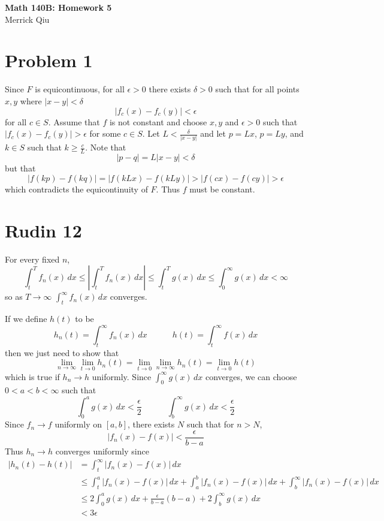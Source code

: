 \documentclass{article}
\begin{document}
\begin{center}
	\huge{\bf Math 140B: Homework 5} \\
	Merrick Qiu
\end{center}

\section*{Problem 1}

Since $F$ is equicontinuous,
for all $\epsilon > 0$ there exists $\delta > 0$ such that
for all points $x, y$ where $|x-y| < \delta$ 
\[
	|f_c(x) - f_c(y)| < \epsilon
\]
for all $c \in S$.
Assume that $f$ is not constant
and choose $x,y$ and $\epsilon > 0$ such that 
$|f_c(x) - f_c(y)| > \epsilon$ for some $c \in S$.
Let $L < \frac{\delta}{|x-y|}$ and let $p = Lx$, $p = Ly$, and 
$k \in S$ such that $k \geq \frac{c}{L}$.
Note that 
\[
	|p-q| = L|x-y| < \delta
\]
but that 
\[
	|f(kp) - f(kq)| = |f(kLx) - f(kLy)| > |f(cx) - f(cy)| > \epsilon
\]
which contradicts the equicontinuity of $F$.
Thus $f$ must be constant.
\newpage 

\section*{Rudin 12}
For every fixed $n$, 
\[
	\int_t^T f_n(x) \,dx \leq \left|\int_t^T f_n(x) \,dx \right| \leq \int_t^T g(x) \,dx \leq \int_0^\infty g(x) \,dx < \infty
\]
so as $T \to \infty$ $\int_t^\infty f_n(x) \,dx$ converges.

If we define $h(t)$ to be
\[
	h_n(t) = \int_t^\infty f_n(x) \,dx \quad\quad\quad h(t) = \int_t^\infty f(x) \,dx
\]
then we just need to show that 
\[
	\lim_{n \to \infty} \lim_{t \to 0} h_n(t) = \lim_{t \to 0} \lim_{n \to \infty}  h_n(t) = \lim_{t \to 0} h(t)
\]
which is true if $h_n \to h$ uniformly.
Since $\int_0^\infty g(x) \,dx$ converges, we can choose $0 < a < b < \infty$
such that 
\[
	\int_0^a g(x) \,dx < \frac{\epsilon}{2} \quad\quad\quad \int_b^\infty g(x) \,dx < \frac{\epsilon}{2} 
\]
Since $f_n \to f$ uniformly on $[a,b]$, there exists $N$ such that for $n > N$,
\[
	|f_n(x) - f(x)| < \frac{\epsilon}{b-a}
\]
Thus $h_n \to h$ converges uniformly since 
\begin{align*}
	|h_n(t) - h(t)| &= \int_t^\infty |f_n(x) - f(x)| \,dx \\
	&\leq \int_t^a |f_n(x) - f(x)| \,dx + \int_a^b |f_n(x) - f(x)| \,dx + \int_b^\infty |f_n(x) - f(x)| \,dx \\
	&\leq 2\int_0^a g(x) \,dx +\frac{\epsilon}{b-a}(b-a) + 2\int_b^\infty g(x) \,dx \\
	&< 3\epsilon
\end{align*}
\newpage 
\end{document}
